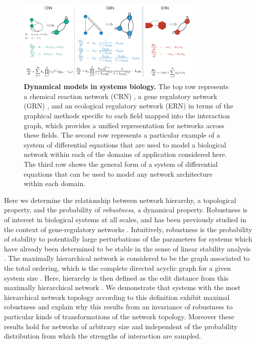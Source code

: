 \begin{figure}[!ht]
\centering
\noindent\includegraphics[width=0.8\textwidth]{fig/biomodelexamples.pdf}
\caption{{\bf Dynamical models in systems biology.} The top row represents a chemical reaction network (CRN) \cite{Shinar2010}, a gene regulatory network (GRN) \cite{Karlebach2008}, and an ecological regulatory network (ERN) \cite{Rohr2014} in terms of the graphical methods specific to each field mapped into the interaction graph, which provides a unified representation for networks across these fields. The second row represents a particular example of a system of differential equations that are used to model a biological network within each of the domains of application considered here. The third row shows the general form of a system of differential equations that can be used to model any network architecture within each domain.}
\label{fig:biomodelexamples}
\end{figure}

Here we determine the relationship between network hierarchy, a topological property, and the probability of \emph{robustness}, a dynamical property. Robustness is of interest in biological systems at all scales, and has been previously studied in the context of gene-regulatory networks \cite{WADDINGTON1942a,VanNimwegen1999,Siegal2002,Ciliberti2007b,Ciliberti2007,Wagner2013}. Intuitively, robustness is the probability of stability to potentially large perturbations of the parameters for systems which have already been determined to be stable in the sense of linear stability analysis \cite{Davis1962}. The maximally hierarchical network is considered to be the graph associated to the total ordering, which is the complete directed acyclic graph for a given system size \cite{Cormen2009}. Here, hierarchy is then defined as the edit distance from this maximally hierarchical network \cite{Axenovich2011}. We demonstrate that systems with the most hierarchical network topology according to this definition exhibit maximal robustness and explain why this results from an invariance of robustness to particular kinds of transformations of the network topology. Moreover these results hold for networks of arbitrary size and independent of the probability distribution from which the strengths of interaction are sampled.

